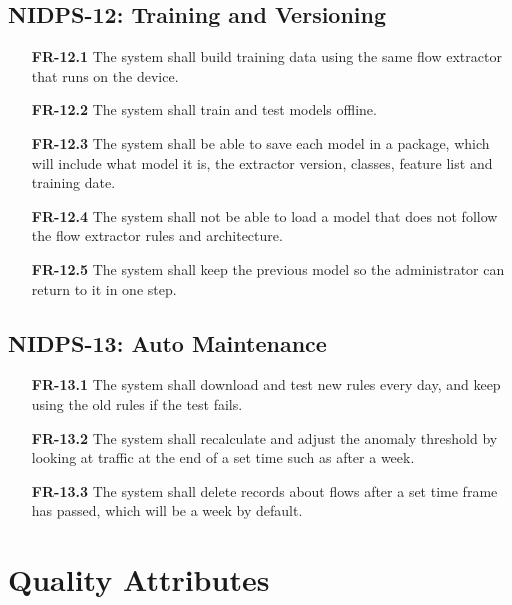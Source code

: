 \subsection{NIDPS-12: Training and Versioning}\label{sec:4.2.12}

\begin{itemize}[leftmargin=4.4em,labelwidth=3.9em,labelsep=0.5em,align=left]
\item[\hypertarget{req:FR-12.1}{\textbf{FR-12.1}}] The system shall build training data using the same flow extractor that runs on the device.
\item[\hypertarget{req:FR-12.2}{\textbf{FR-12.2}}] The system shall train and test models offline.
\item[\hypertarget{req:FR-12.3}{\textbf{FR-12.3}}] The system shall be able to save each model in a package, which will include what model it is, the extractor version, classes, feature list and training date.
\item[\hypertarget{req:FR-12.4}{\textbf{FR-12.4}}] The system shall not be able to load a model that does not follow the flow extractor rules and architecture.
\item[\hypertarget{req:FR-12.5}{\textbf{FR-12.5}}] The system shall keep the previous model so the administrator can return to it in one step.
\end{itemize}

\subsection{NIDPS-13: Auto Maintenance}\label{sec:4.2.13}

\begin{itemize}[leftmargin=4.4em,labelwidth=3.9em,labelsep=0.5em,align=left]
\item[\hypertarget{req:FR-13.1}{\textbf{FR-13.1}}] The system shall download and test new rules every day, and keep using the old rules if the test fails.
\item[\hypertarget{req:FR-13.2}{\textbf{FR-13.2}}] The system shall recalculate and adjust the anomaly threshold by looking at traffic at the end of a set time such as after a week.
\item[\hypertarget{req:FR-13.3}{\textbf{FR-13.3}}] The system shall delete records about flows after a set time frame has passed, which will be a week by default.
\end{itemize}

\section{Quality Attributes}\label{sec:4.3}

